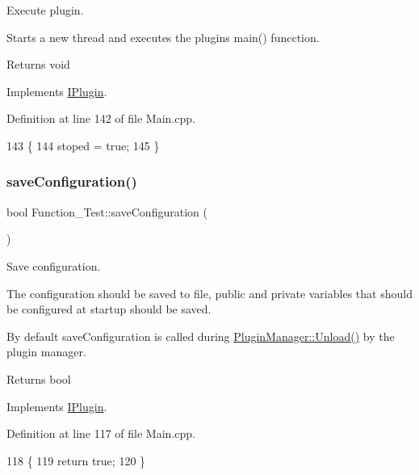 Execute plugin. 

Starts a new thread and executes the plugins main() funcction. \begin{DoxyReturn}{Returns}
void 
\end{DoxyReturn}


Implements \hyperlink{class_i_plugin_a46b4ace767e77f9db9c9585e99c09039}{I\+Plugin}.



Definition at line 142 of file Main.\+cpp.


\begin{DoxyCode}
143 \{
144     stoped = \textcolor{keyword}{true};
145 \}
\end{DoxyCode}
\mbox{\label{class_function___test_a6d8832ce28b9b659c85db0e32183abc9}} 
\subsubsection{\texorpdfstring{save\+Configuration()}{saveConfiguration()}}
{\footnotesize\ttfamily bool Function\+\_\+\+Test\+::save\+Configuration (\begin{DoxyParamCaption}{ }\end{DoxyParamCaption})\hspace{0.3cm}{\ttfamily [virtual]}}



Save configuration. 

The configuration should be saved to file, public and private variables that should be configured at startup should be saved.

By default save\+Configuration is called during \hyperlink{class_plugin_manager_ab651a05d6fcb92562807e9f5ecc30855}{Plugin\+Manager\+::\+Unload()} by the plugin manager.

\begin{DoxyReturn}{Returns}
bool 
\end{DoxyReturn}


Implements \hyperlink{class_i_plugin_a79b5c42b1c7b08257a6110b2091039bc}{I\+Plugin}.



Definition at line 117 of file Main.\+cpp.


\begin{DoxyCode}
118 \{
119     \textcolor{keywordflow}{return} \textcolor{keyword}{true};
120 \}
\end{DoxyCode}
\mbox{\label{class_function___test_ac4a090ec1f44393fc7a8e851cb76fb29}} 
